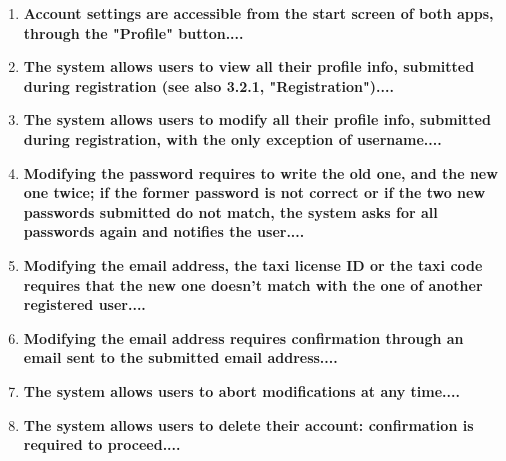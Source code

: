 \begin{enumerate}
	\item \textbf{Account settings are accessible from the start screen of both apps, through
		the "Profile" button....}\\
	
	\item \textbf{The system allows users to view all their profile info, submitted during
		registration (see also 3.2.1, "Registration")....}\\
	
	\item \textbf{The system allows users to modify all their profile info, submitted during
		registration, with the only exception of username....}\\
	
	\item \textbf{Modifying the password requires to write the old one, and the new one
		twice; if the former password is not correct or if the two new passwords
		submitted do not match, the system asks for all passwords again and
		notifies the user....}\\
	
	\item \textbf{Modifying the email address, the taxi license ID or the taxi code requires
		that the new one doesn't match with the one of another registered user....}\\
	
	\item \textbf{ Modifying the email address requires confirmation through an email sent
		to the submitted email address....}\\
	
	\item \textbf{The system allows users to abort modifications at any time....}\\
	
	\item \textbf{The system allows users to delete their account: confirmation is required
		to proceed....}\\		
\end{enumerate}
